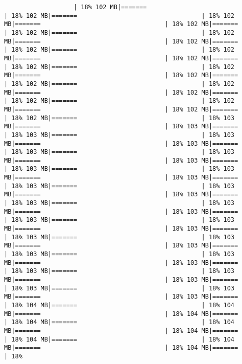 \documentclass[
]{article}
\begin{document}
\begin{verbatim}
                   | 18% 102 MB|=======                                  | 18% 102 MB|=======                                  | 18% 102 MB|=======                                  | 18% 102 MB|=======                                  | 18% 102 MB|=======                                  | 18% 102 MB|=======                                  | 18% 102 MB|=======                                  | 18% 102 MB|=======                                  | 18% 102 MB|=======                                  | 18% 102 MB|=======                                  | 18% 102 MB|=======                                  | 18% 102 MB|=======                                  | 18% 102 MB|=======                                  | 18% 102 MB|=======                                  | 18% 102 MB|=======                                  | 18% 102 MB|=======                                  | 18% 102 MB|=======                                  | 18% 102 MB|=======                                  | 18% 102 MB|=======                                  | 18% 102 MB|=======                                  | 18% 103 MB|=======                                  | 18% 103 MB|=======                                  | 18% 103 MB|=======                                  | 18% 103 MB|=======                                  | 18% 103 MB|=======                                  | 18% 103 MB|=======                                  | 18% 103 MB|=======                                  | 18% 103 MB|=======                                  | 18% 103 MB|=======                                  | 18% 103 MB|=======                                  | 18% 103 MB|=======                                  | 18% 103 MB|=======                                  | 18% 103 MB|=======                                  | 18% 103 MB|=======                                  | 18% 103 MB|=======                                  | 18% 103 MB|=======                                  | 18% 103 MB|=======                                  | 18% 103 MB|=======                                  | 18% 103 MB|=======                                  | 18% 103 MB|=======                                  | 18% 103 MB|=======                                  | 18% 103 MB|=======                                  | 18% 103 MB|=======                                  | 18% 103 MB|=======                                  | 18% 103 MB|=======                                  | 18% 103 MB|=======                                  | 18% 103 MB|=======                                  | 18% 103 MB|=======                                  | 18% 103 MB|=======                                  | 18% 103 MB|=======                                  | 18% 103 MB|=======                                  | 18% 103 MB|=======                                  | 18% 104 MB|=======                                  | 18% 104 MB|=======                                  | 18% 104 MB|=======                                  | 18% 104 MB|=======                                  | 18% 104 MB|=======                                  | 18% 104 MB|=======                                  | 18% 104 MB|=======                                  | 18% 104 MB|=======                                  | 18% 104 MB|=======                                  | 18% 
\end{verbatim}
\end{document}
